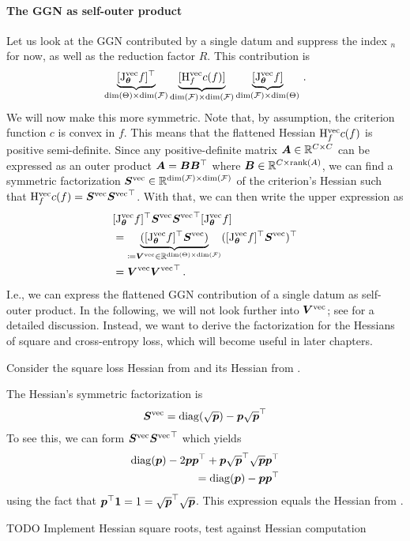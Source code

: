 \paragraph{The GGN as self-outer product}
Let us look at the GGN contributed by a single datum and suppress the index $_n$ for now, as well as the reduction factor $R$.
This contribution is
\begin{align*}
  \underbrace{[\mathrm{J}_{{\bm{\theta}}}^{\operatorname{vec}} f]^{\top}}_{\dim(\Theta) \times \dim({\mathcal{F}})}
  \underbrace{[\mathrm{H}^{\operatorname{vec}}_{f} c(f)]}_{\dim({\mathcal{F}}) \times \dim({\mathcal{F}})}
  \underbrace{[\mathrm{J}_{{\bm{\theta}}}^{\operatorname{vec}} f]}_{\dim({\mathcal{F}}) \times \dim(\Theta)}\,.
\end{align*}
We will now make this more symmetric.
Note that, by assumption, the criterion function $c$ is convex in $f$.
This means that the flattened Hessian $\mathrm{H}^{\operatorname{vec}}_{f} c(f)$ is positive semi-definite.
Since any positive-definite matrix ${\bm{A}} \in {\mathbb{R}}^{C \times C}$ can be expressed as an outer product ${\bm{A}} = {\bm{B}} {\bm{B}}^{\top}$ where ${\bm{B}} \in {\mathbb{R}}^{C \times \operatorname{rank}(A)}$, we can find a symmetric factorization ${\bm{S}}^{\operatorname{vec}} \in {\mathbb{R}}^{\dim({\mathcal{F}}) \times \dim({\mathcal{F}})}$ of the criterion's Hessian such that $\mathrm{H}^{\operatorname{vec}}_{f} c(f) = {\bm{S}}^{\operatorname{vec}} {{\bm{S}}^{\operatorname{vec}}}^{\top}$.
With that, we can then write the upper expression as
\begin{align*}
  &[\mathrm{J}_{{\bm{\theta}}}^{\operatorname{vec}} f]^{\top} {\bm{S}}^{\operatorname{vec}} {{\bm{S}}^{\operatorname{vec}}}^{\top} [\mathrm{J}_{{\bm{\theta}}}^{\operatorname{vec}} f]
  \\
  &=
  \underbrace{([\mathrm{J}_{{\bm{\theta}}}^{\operatorname{vec}} f]^{\top} {\bm{S}}^{\operatorname{vec}})}_{\coloneq {\bm{V}}^{\operatorname{vec}} \in {\mathbb{R}}^{\dim(\Theta) \times \dim({\mathcal{F}})}}
  ([\mathrm{J}_{{\bm{\theta}}}^{\operatorname{vec}} f]^{\top} {\bm{S}}^{\operatorname{vec}})^{\top}
  \\
  &=
  {\bm{V}}^{\operatorname{vec}} {{\bm{V}}^{\operatorname{vec}}}^{\top}\,.
\end{align*}
I.e., we can express the flattened GGN contribution of a single datum as self-outer product.
In the following, we will not look further into ${\bm{V}}^{\operatorname{vec}}$; see \cite{dangel2022vivit,papyan2019measurements} for a detailed discussion. Instead, we want to derive the factorization for the Hessians of square and cross-entropy loss, which will become useful in later chapters.
\begin{example}
  Consider the square loss Hessian from  and its Hessian from .
\end{example}

\begin{example}
  The Hessian's symmetric factorization is \cite[e.g.][]{papyan2019measurements}
  \begin{align*}
    {\bm{S}}^{\operatorname{vec}} = \operatorname{diag}(\sqrt{{\bm{p}}}) - {\bm{p}} \sqrt{{\bm{p}}}^{\top}
  \end{align*}
  To see this, we can form ${\bm{S}}^{\operatorname{vec}} {{\bm{S}}^{\operatorname{vec}}}^{\top}$ which yields
  \begin{align*}
    \operatorname{diag}({\bm{p}}) - 2 {\bm{p}} {\bm{p}}^{\top} + {\bm{p}} \sqrt{{\bm{p}}}^{\top} \sqrt{{\bm{p}}} {\bm{p}}^{\top}
    \\
    = \operatorname{diag}({\bm{p}}) - {\bm{p}} {\bm{p}}^{\top}
  \end{align*}
  using the fact that ${\bm{p}}^{\top} {\bm{1}} = 1 = \sqrt{{\bm{p}}}^{\top} \sqrt{{\bm{p}}}$.
  This expression equals the Hessian from .
\end{example}

TODO Implement Hessian square roots, test against Hessian computation


